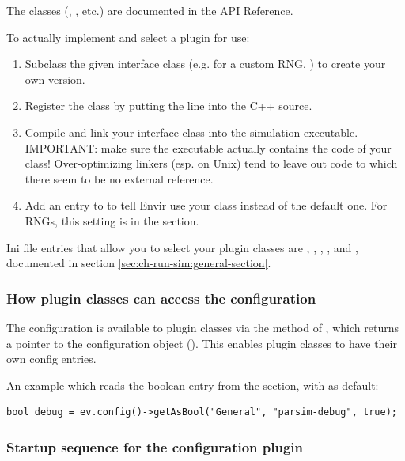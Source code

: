 The classes (, , etc.) are documented in
the API Reference.

To actually implement and select a plugin for use:

\begin{enumerate}
   \item Subclass the given interface class (e.g. for a custom RNG, )
     to create your own version.
   \item Register the class by putting the 
     line into the C++ source.
   \item Compile and link your interface class into the {\opp} simulation
     executable. IMPORTANT: make sure the executable actually contains
     the code of your class! Over-optimizing linkers (esp. on Unix)
     tend to leave out code to which there seem to be no external reference.
   \item Add an entry to  to tell Envir use your class
     instead of the default one. For RNGs, this setting is 
     in the \ttt{[General]} section.
\end{enumerate}

Ini file entries that allow you to select your
plugin classes are , ,
, ,
 and ,
documented in section \ref{sec:ch-run-sim:general-section}.

\subsubsection{How plugin classes can access the configuration}

The configuration is available to plugin classes via the 
method of , which returns a pointer to the configuration
object (). This enables plugin classes to have
their own config entries.

An example which reads the  boolean entry from the
\ttt{[General]} section, with  as default:

\begin{verbatim}
bool debug = ev.config()->getAsBool("General", "parsim-debug", true);
\end{verbatim}


\subsubsection{Startup sequence for the configuration plugin}

